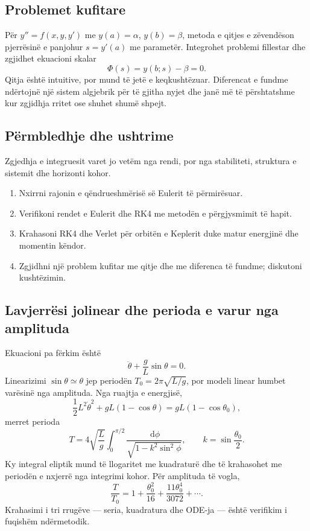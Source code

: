 \documentclass[11pt,oneside,openany]{book}
\newcommand{\dd}{\,\mathrm{d}}
\begin{document}
\subsection{Problemet kufitare}
Për $y''=f(x,y,y')$ me $y(a)=\alpha$, $y(b)=\beta$, metoda e qitjes e zëvendëson pjerrësinë e panjohur $s=y'(a)$ me parametër. Integrohet problemi fillestar dhe zgjidhet ekuacioni skalar
\begin{equation}
 \Phi(s)=y(b;s)-\beta=0.
\end{equation}
Qitja është intuitive, por mund të jetë e keqkushtëzuar. Diferencat e fundme ndërtojnë një sistem algjebrik për të gjitha nyjet dhe janë më të përshtatshme kur zgjidhja rritet ose shuhet shumë shpejt.

\subsection{Përmbledhje dhe ushtrime}
Zgjedhja e integruesit varet jo vetëm nga rendi, por nga stabiliteti, struktura e sistemit dhe horizonti kohor.
\begin{enumerate}
\item Nxirrni rajonin e qëndrueshmërisë së Eulerit të përmirësuar.
\item Verifikoni rendet e Eulerit dhe RK4 me metodën e përgjysmimit të hapit.
\item Krahasoni RK4 dhe Verlet për orbitën e Keplerit duke matur energjinë dhe momentin këndor.
\item Zgjidhni një problem kufitar me qitje dhe me diferenca të fundme; diskutoni kushtëzimin.
\end{enumerate}



\subsection{Lavjerrësi jolinear dhe perioda e varur nga amplituda}
Ekuacioni pa fërkim është
\begin{equation}
 \ddot\theta+\frac{g}{L}\sin\theta=0.
\end{equation}
Linearizimi $\sin\theta\simeq\theta$ jep periodën $T_0=2\pi\sqrt{L/g}$, por modeli linear humbet varësinë nga amplituda. Nga ruajtja e energjisë,
\begin{equation}
 \frac12L^2\dot\theta^2+gL(1-\cos\theta)
 =gL(1-\cos\theta_0),
\end{equation}
merret perioda
\begin{equation}
 T=4\sqrt{\frac{L}{g}}
 \int_0^{\pi/2}\frac{\dd\phi}
 {\sqrt{1-k^2\sin^2\phi}},
 \qquad k=\sin\frac{\theta_0}{2}.
\end{equation}
Ky integral eliptik mund të llogaritet me kuadraturë dhe të krahasohet me periodën e nxjerrë nga integrimi kohor. Për amplituda të vogla,
\begin{equation}
 \frac{T}{T_0}=1+\frac{\theta_0^2}{16}
 +\frac{11\theta_0^4}{3072}+\cdots.
\end{equation}
Krahasimi i tri rrugëve --- seria, kuadratura dhe ODE-ja --- është verifikim i fuqishëm ndërmetodik.
\end{document}
